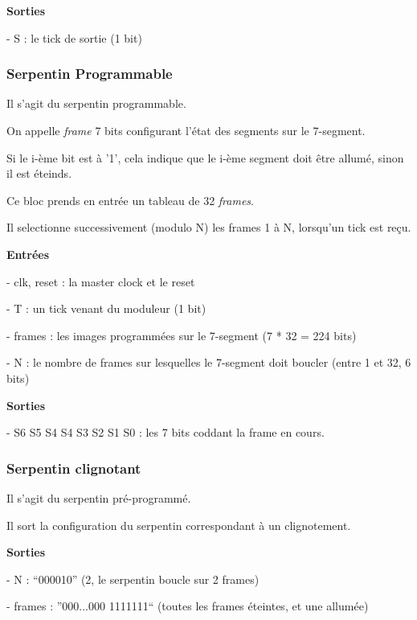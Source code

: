 \documentclass[10pt]{article}
\begin{document}
        \textbf{Sorties}
            
            - S : le tick de sortie (1 bit)
        
        \subsubsection{Serpentin Programmable}
        
        Il s'agit du serpentin programmable.
        
        On appelle \textit{frame} 7 bits configurant l'état des segments sur le 7-segment.

        Si le i-ème bit est à '1', cela indique que le i-ème segment doit être allumé, sinon il est éteinds.
        
        Ce bloc prends en entrée un tableau de 32 \textit{frames}.
        
        Il selectionne successivement (modulo N) les frames 1 à N, lorsqu'un tick est reçu.

        \textbf{Entrées}
        
            - clk, reset : la master clock et le reset

            - T : un tick venant du moduleur (1 bit)
            
            - frames : les images programmées sur le 7-segment (7 * 32 = 224 bits)
            
            - N : le nombre de frames sur lesquelles le 7-segment doit boucler (entre 1 et 32, 6 bits)
            
        \textbf{Sorties}
            
            - S6 S5 S4 S4 S3 S2 S1 S0 : les 7 bits coddant la frame en cours.
        
        \subsubsection{Serpentin clignotant}
        
        Il s'agit du serpentin pré-programmé.
        
        Il sort la configuration du serpentin correspondant à un clignotement.
        
        \textbf{Sorties}
            
            - N : ``000010'' (2, le serpentin boucle sur 2 frames)
            
            - frames : ''000...000 1111111`` (toutes les frames éteintes, et une allumée)
        
\end{document}
